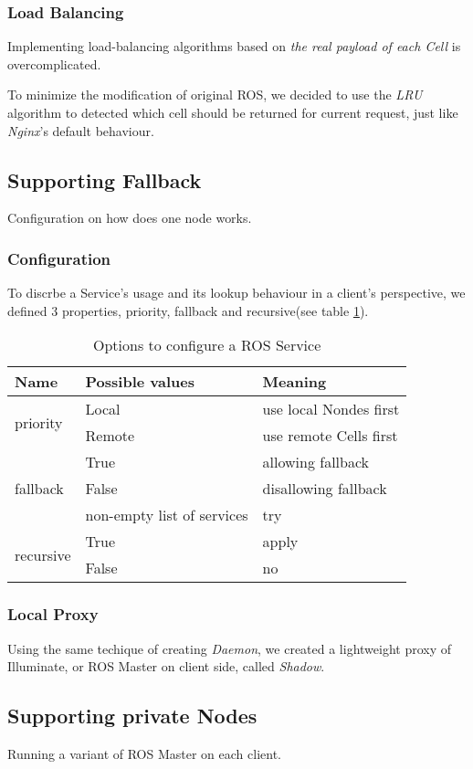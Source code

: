 \subsubsection{Load Balancing}
Implementing load-balancing algorithms based on \emph{the real payload of each Cell} is overcomplicated.

To minimize the modification of original ROS, we decided to use the \emph{LRU} algorithm to detected which cell should be returned for current request, just like \emph{Nginx}'s default behaviour.

\subsection{Supporting Fallback}
Configuration on how does one node works. 

\subsubsection{Configuration}
To discrbe a Service's usage and its lookup behaviour in a client's perspective, we defined 3 properties, priority, fallback and recursive(see table \ref{table:srv-opt}).

\begin{table}
    \renewcommand{\arraystretch}{1.3}
    \caption{Options to configure a ROS Service}
    \label{table:srv-opt}
    \centering
    \begin{tabular}{l|l|l}
        \hline
        \bfseries Name & \bfseries Possible values & \bfseries Meaning \\
        \hline
        \multirow{2}{*}{priority}  & Local  & use local Nondes first \\
                                   & Remote & use remote Cells first \\
        \multirow{3}{*}{fallback}  & True   & allowing fallback \\
                                   & False  & disallowing fallback \\
                                   & non-empty list of services & try  \\
        \multirow{2}{*}{recursive} & True   & apply \\
                                   & False  & no \\
        \hline
    \end{tabular}
\end{table} 

\subsubsection{Local Proxy}
Using the same techique of creating \emph{Daemon}, we created a lightweight proxy of Illuminate, or ROS Master on client side, called \emph{Shadow}.


\subsection{Supporting private Nodes}
Running a variant of ROS Master on each client.



